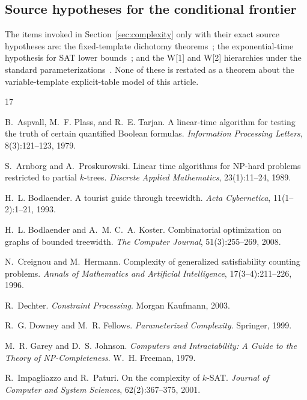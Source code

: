 \documentclass[11pt]{article}
\theoremstyle{plain}
\theoremstyle{definition}
\theoremstyle{remark}
\begin{document}
\subsection{Source hypotheses for the conditional frontier}

The items invoked in Section~\ref{sec:complexity} only with their exact
source hypotheses are: the fixed-template dichotomy
theorems~\cite{schaefer78,zhuk17}; the exponential-time hypothesis for SAT
lower bounds~\cite{impagliazzo-paturi01}; and the W[1] and W[2] hierarchies
under the standard parameterizations~\cite{downey-fellows99}.  None of these
is restated as a theorem about the variable-template explicit-table model of
this article.

\begin{thebibliography}{17}

 B.~Aspvall, M.~F. Plass, and R.~E. Tarjan.
A linear-time algorithm for testing the truth of certain quantified Boolean
formulas. \emph{Information Processing Letters}, 8(3):121--123, 1979.

 S.~Arnborg and A.~Proskurowski.
Linear time algorithms for NP-hard problems restricted to partial $k$-trees.
\emph{Discrete Applied Mathematics}, 23(1):11--24, 1989.

 H.~L. Bodlaender.
A tourist guide through treewidth. \emph{Acta Cybernetica},
11(1--2):1--21, 1993.

 H.~L. Bodlaender and A.~M. C.~A. Koster.
Combinatorial optimization on graphs of bounded treewidth.
\emph{The Computer Journal}, 51(3):255--269, 2008.

 N.~Creignou and M.~Hermann.
Complexity of generalized satisfiability counting problems.
\emph{Annals of Mathematics and Artificial Intelligence}, 17(3--4):211--226,
1996.

 R.~Dechter. \emph{Constraint Processing}.
Morgan Kaufmann, 2003.

 R.~G. Downey and M.~R. Fellows.
\emph{Parameterized Complexity}. Springer, 1999.

 M.~R. Garey and D.~S. Johnson.
\emph{Computers and Intractability: A Guide to the Theory of
NP-Completeness}. W.~H. Freeman, 1979.

 R.~Impagliazzo and R.~Paturi.
On the complexity of $k$-SAT. \emph{Journal of Computer and System
Sciences}, 62(2):367--375, 2001.


\end{thebibliography}
\end{document}
